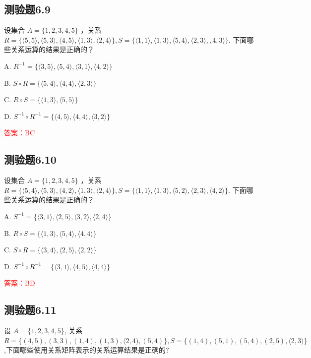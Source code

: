 \documentclass[UTF8, heading=true]{ctexart}
\begin{document}
\subsection{测验题6.9}

设集合 $A=\{1,2,3,4,5\}$ ，关系 $R=\{\langle 5,5\rangle,\langle 5,3\rangle,\langle 4,5\rangle,\langle 1,3\rangle,\langle 2,4\rangle\}, S=\{\langle 1,1\rangle,\langle 1,3\rangle,\langle 5,4\rangle,\langle 2,3\rangle,, 4,3\rangle\}$.
下面哪些关系运算的结果是正确的？

A. $ R^{-1}=\{\langle 3,5\rangle,\langle 5,4\rangle,\langle 3,1\rangle,\langle 4,2\rangle\} $

B. $S \circ R=\{\langle 5,4\rangle,\langle 4,4\rangle,\langle 2,3\rangle\} $

C. $ R \circ S=\{\langle 1,3\rangle,\langle 5,5\rangle\} $

D. $ S^{-1} \circ R^{-1}=\{\langle 4,5\rangle,\langle 4,4\rangle,\langle 3,2\rangle\}$

\textcolor{red}{答案：BC}


\subsection{测验题6.10}

设集合 $A=\{1,2,3,4,5\}$ ，关系 $R=\{\langle 5,4\rangle,\langle 5,3\rangle,\langle 4,2\rangle,\langle 1,3\rangle,\langle 2,4\rangle\}, S=\{\langle 1,1\rangle,\langle 1,3\rangle,\langle 5,2\rangle,\langle 2,3\rangle,\langle 4,2\rangle\}$.
下面哪些关系运算的结果是正确的？

A. $S^{-1}=\{\langle 3,1\rangle,\langle 2,5\rangle,\langle 3,2\rangle,\langle 2,4\rangle\}$

B. $R \circ S=\{\langle 1,3\rangle,\langle 5,4\rangle,\langle 4,4\rangle\}$

C. $ S \circ R=\{\langle 3,4\rangle,\langle 2,5\rangle,\langle 2,2\rangle\}$

D. $ S^{-1} \circ R^{-1}=\{\langle 3,1\rangle,\langle 4,5\rangle,\langle 4,4\rangle\}$

\textcolor{red}{答案：BD}



\subsection{测验题6.11}

设 $A=\{1,2,3,4,5\}$, 关系 $R=\{(4,5),(3,3),(1,4),(1,3),\langle 2,4),(5,4)\}, S=\{(1,4),(5,1),(5,4),(2,5),\langle 2,3)\}$,下面哪些使用关系矩阵表示的关系运算结果是正确的?
\end{document}
